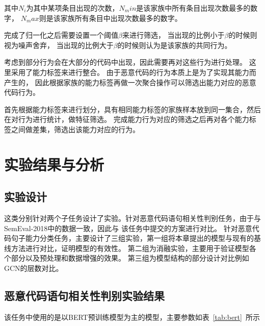 其中$N_i$为其中某项条目出现的次数，$N_min$是该家族中所有条目出现次数最多的数字，
$N_max$则是该家族所有条目中出现次数最多的数字。

完成了归一化之后需要设置一个阈值$\beta$来进行筛选，
当出现的比例小于$\beta$的时候则视为噪声舍弃，
当出现的比例大于$\beta$的时候则认为是该家族的共同行为。

考虑到部分行为会在大部分的代码中出现，因此需要再对这些行为进行处理。
这里采用了能力标签来进行整合。
由于恶意代码的行为本质上是为了实现其能力而产生的，
因此根据家族的能力标签再做一次聚合操作可以筛选出能力对应的恶意代码行为。

首先根据能力标签来进行划分，具有相同能力标签的家族样本放到同一集合，然后
在对行为进行统计，做特征筛选。
完成能力行为对应的筛选之后再对各个能力标签之间做差集，筛选出该能力对应的行为。


\section{实验结果与分析}

\subsection{实验设计}
这类分别针对两个子任务设计了实验。针对恶意代码语句相关性判别任务，由于与SemEval-2018中的数据一致，因此与
该任务中提交的方案进行对比。
针对恶意代码句子能力分类任务，主要设计了三组实验，第一组将本章提出的模型与现有的基线方法进行对比，证明模型的有效性。
第二组为消融实验，主要用于验证模型各个部分以及预处理和数据增强的效果。 第三组为模型结构的部分设计对比例如GCN的层数对比。


\subsection{恶意代码语句相关性判别实验结果}
该任务中使用的是以BERT预训练模型为主的模型，主要参数如表~\ref{tab:bert}~所示
\begin{table}[htb]
	\renewcommand{\arraystretch}{1.3}
	\caption{BERT预训练模型}
	\label{tab:bert}
	\vspace{0.5em}\centering\wuhao
\end{table}

